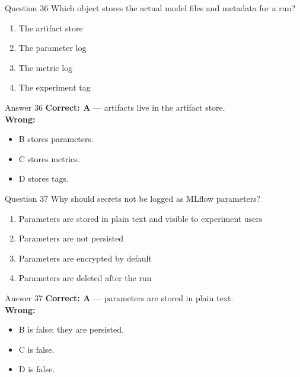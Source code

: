 \documentclass[aspectratio=169,11pt]{beamer}
\begin{document}
	\begin{frame}{Question 36}
		Which object stores the actual model files and metadata for a run?
		\begin{enumerate}[label=\Alph*.]
			\item The artifact store
			\item The parameter log
			\item The metric log
			\item The experiment tag
		\end{enumerate}
	\end{frame}
	\begin{frame}{Answer 36}
		\textbf{Correct: A} --- artifacts live in the artifact store.\\
		\vspace{0.5em}
		\textbf{Wrong:}
		\begin{itemize}
			\item B stores parameters.
			\item C stores metrics.
			\item D stores tags.
		\end{itemize}
	\end{frame}
	
	\begin{frame}{Question 37}
		Why should secrets not be logged as MLflow parameters?
		\begin{enumerate}[label=\Alph*.]
			\item Parameters are stored in plain text and visible to experiment users
			\item Parameters are not persisted
			\item Parameters are encrypted by default
			\item Parameters are deleted after the run
		\end{enumerate}
	\end{frame}
	\begin{frame}{Answer 37}
		\textbf{Correct: A} --- parameters are stored in plain text.\\
		\vspace{0.5em}
		\textbf{Wrong:}
		\begin{itemize}
			\item B is false; they are persisted.
			\item C is false.
			\item D is false.
		\end{itemize}
	\end{frame}
	
\end{document}
